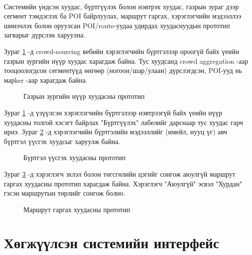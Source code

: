 \paragraph{} Системийн үндсэн хуудас, бүртгүүлэх болон нэвтрэх хуудас, газрын зураг дээр сегмент тэмдэглэх ба POI байрлуулах, маршрут гаргах, хэрэглэгчийн мэдээллээ шинэчлэх болон оруулсан POI/route-уудаа удирдах хуудаснуудын прототип загварыг дүрслэн харуулна.
\par \noindent Зураг \ref{fig:proto_map} -д crowd-sourcing вебийн хэрэглэгчийн бүртгэлээр ороогүй байх үеийн газрын зургийн нүүр хуудас харагдаж байна. Тус хуудсанд crowd aggregation -аар тооцоологдсон сегментүүд өнгөөр (ногоон/шар/улаан) дүрслэгдсэн, POI-ууд нь марker -аар харагдаж байна.
\begin{figure}[!h]
    \centering
    \caption{Газрын зургийн нүүр хуудасны прототип}
    \label{fig:proto_map}
\end{figure}
\newline
\par \noindent Зураг \ref{fig:proto_map} -д үзүүлсэн хэрэглэгчийн бүртгэлээр нэвтрээгүй байх үеийн нүүр хуудасны толгой хэсэгт байрлах "Бүртгүүлэх" лабелийг дарснаар тус хуудас гарч ирнэ. Зураг \ref{fig:proto_signup} -д хэрэглэгчийн бүртгэлийн мэдээллийг (имейл, нууц үг) авч бүртгэл үүсгэх хуудсыг харуулж байна.
\begin{figure}[H]
    \centering
    \caption{Бүртгэл үүсгэх хуудасны прототип}
    \label{fig:proto_signup}
\end{figure}
\par \noindent Зураг \ref{fig:proto_route} -д хэрэглэгч эхлэл болон төгсгөлийн цэгийг сонгож аюулгүй маршрут гаргах хуудасны прототип харагдаж байна. Хэрэглэгч "Аюулгүй" эсвэл "Хурдан" гэсэн маршрутын төрлийг сонгож болно.
\begin{figure}[H]
    \centering
    \caption{Маршрут гаргах хуудасны прототип}
    \label{fig:proto_route}
\end{figure}

\section{Хөгжүүлсэн системийн интерфейс}
